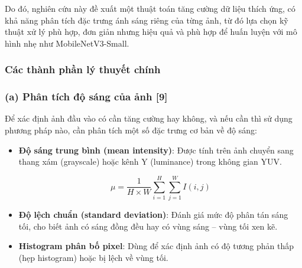 Do đó, nghiên cứu này đề xuất một thuật toán tăng cường dữ liệu thích ứng, có khả năng phân tích đặc trưng ánh sáng riêng của từng ảnh, từ đó lựa chọn kỹ thuật xử lý phù hợp, đơn giản nhưng hiệu quả và phù hợp để huấn luyện với mô hình nhẹ như MobileNetV3-Small.

\subsubsection{Các thành phần lý thuyết chính} %
\subsubsection*{(a) Phân tích độ sáng của ảnh [9]}

Để xác định ảnh đầu vào có cần tăng cường hay không, và nếu cần thì sử dụng phương pháp nào, cần phân tích một số đặc trưng cơ bản về độ sáng:


\begin{itemize}[]
    \item \textbf{Độ sáng trung bình (mean intensity)}: Được tính trên ảnh chuyển sang thang xám (grayscale) hoặc kênh Y (luminance) trong không gian YUV.
    
    \[ \mu = \frac{1}{H \times W} \sum_{i=1}^{H} \sum_{j=1}^{W} I(i,j) \]
    
    \item \textbf{Độ lệch chuẩn (standard deviation)}: Đánh giá mức độ phân tán sáng tối, cho biết ảnh có sáng đồng đều hay có vùng sáng -- vùng tối xen kẽ.
    \item \textbf{Histogram phân bố pixel}: Dùng để xác định ảnh có độ tương phản thấp (hẹp histogram) hoặc bị lệch về vùng tối.
\end{itemize}

